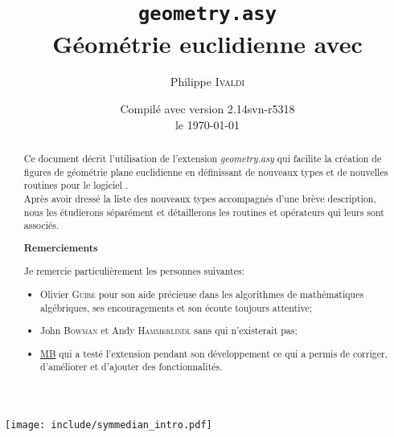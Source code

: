 \documentclass[pdftex]{article}
\newcommand{\geo}{l'extension \emph{geometry.asy}\xspace}
\begin{document}
\renewcommand{\thefootnote}{\fnsymbol{footnote}}

\title{\texttt{geometry.asy}\footnotemark[1]\\
  Géométrie euclidienne avec \asymptote}
\author{Philippe \textsc{Ivaldi}}
\date{Compilé avec \Asymptote{} version 2.14svn-r5318\\le \today}
\maketitle
\hspace*{0mm}\hfill
\begin{center}
  \texttt{[image: include/symmedian\_intro.pdf]}
\end{center}
\hfill\hspace*{0mm}

\renewcommand{\thefootnote}{\arabic{footnote}}
\newpage
\begin{abstract}
  \noindent%
  Ce document décrit l'utilisation de \geo qui facilite la création de
  figures de géométrie plane euclidienne en définissant de nouveaux
  types et de nouvelles routines pour le logiciel
  \href{http://asymptote.sourceforge.net/}{\Asymptote}.\\
  Après avoir dressé la liste des nouveaux types accompagnés d'une
  brève description, nous les étudierons séparément et détaillerons les
  routines et opérateurs qui leurs sont associés.
  \begin{center}\bfseries
    Remerciements
  \end{center}
  Je remercie particulièrement les personnes suivantes:
  \begin{itemize}
  \item Olivier \textsc{Guibé} pour son aide précieuse dans les
    algorithmes de mathématiques algébriques, ses encouragements et
    son écoute toujours attentive;
  \item John \textsc{Bowman} et Andy \textsc{Hammerlindl} sans qui
    \asymptote n'existerait pas;
  \item \href{http://forum.mathematex.net/membre3.html}{MB} qui a
    testé l'extension pendant son développement ce qui a permis de
    corriger, d'améliorer et d'ajouter des fonctionnalités.
  \end{itemize}
\end{abstract}
\tableofcontents
\end{document}
